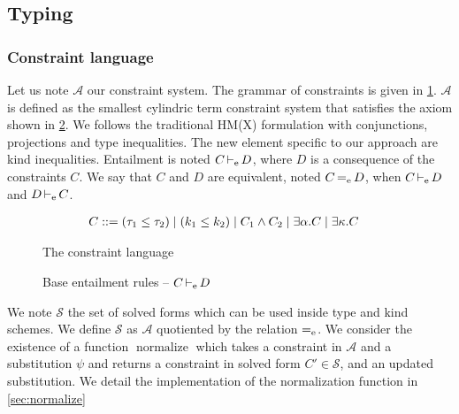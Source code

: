 


\clearpage
\subsection{Typing}
\label{sdtyping}

\subsubsection{Constraint language}

\newcommand\A{\mathcal A}
\newcommand\SC{\mathcal S}

Let us note $\A$ our constraint system. The grammar of constraints is
given in  \cref{grammar:constraint}.
$\A$ is defined as the smallest cylindric term constraint system that
satisfies the axiom shown in \cref{rules:entail}.
We follows the traditional HM(X) formulation
with conjunctions, projections and type inequalities.
The new element specific to our approach are kind inequalities.
Entailment is noted $C \operatorname{\vdash_e} D$, where $D$ is a consequence of the
constraints $C$.
We say that $C$ and $D$ are equivalent, noted $C \operatorname{=_e} D$,
when $C \operatorname{\vdash_e} D$ and $D \operatorname{\vdash_e} C$.

\begin{figure}[tp]
  \centering
  \begin{align*}
    C &::= (\tau_1 \leq \tau_2)
        \mid (k_1 \leq k_2)
        \mid C_1 \wedge C_2
        \mid \exists \alpha.C
        \mid \exists \kappa.C
  \end{align*}
  \caption{The constraint language}
  \label{grammar:constraint}
\end{figure}

\begin{figure*}[tp]
  
  \caption{Lattice inequalities -- $k \lk_\Lat k'$}
  
  \caption{Base entailment rules -- $C \operatorname{\vdash_e} D$ }
  \label{rules:entail}
\end{figure*}


We note $\SC$ the set of solved forms
which can be used inside type and kind schemes.
We define $\SC$ as $\A$ quotiented by the relation $\operatorname{=_e}$.
%
We consider the existence of a function $\operatorname{normalize}$ which takes
a constraint in $\A$ and a substitution $\psi$ and returns a constraint
in solved form $C' \in \SC$,
and an updated substitution. We detail the implementation
of the normalization function in \cref{sec:normalize}

